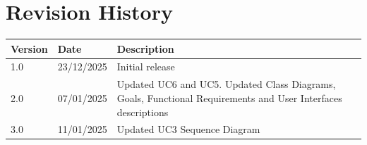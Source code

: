 \setcounter{page}{1}

\chapter*{Revision History}
\begin{table}[H]
\centering
\begin{tabular}{|l|l|p{8cm}|}
\hline
\textbf{Version} & \textbf{Date} & \textbf{Description} \\ \hline
1.0 & 23/12/2025 & Initial release \\ \hline
2.0 & 07/01/2025 & Updated UC6 and UC5. Updated Class Diagrams, Goals, Functional Requirements and User Interfaces descriptions \\ \hline
3.0 & 11/01/2025 & Updated UC3 Sequence Diagram \\ \hline
\end{tabular}
\end{table}

\tableofcontents
\thispagestyle{empty}
\cleardoublepage

\listoffigures
\listoftables
